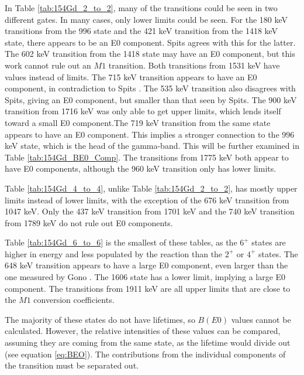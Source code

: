 \afterpage{\clearpage}

In Table \ref{tab:154Gd_2_to_2}, many of the transitions could be seen in two different gates. In many cases, only lower limits could be seen. For the 180 keV transitions from the 996 state and the 421 keV transition from the 1418 keV state, there appears to be an E0 component. Spits \cite{spits96:_154gd} agrees with this for the latter. The 602 keV transition from the 1418 state may have an E0 component, but this work cannot rule out an $M1$ transition. Both transitions from 1531 keV have values instead of limits. The 715 keV transition appears to have an E0 component, in contradiction to Spits \cite{spits96:_154gd}. The 535 keV transition also disagrees with Spits, giving an E0 component, but smaller than that seen by Spits. The 900 keV transition from 1716 keV was only able to get upper limits, which lends itself toward a small E0 component.The 719 keV transition from the same state appears to have an E0 component. This implies a stronger connection to the 996 keV state, which is the head of the gamma-band. This will be further examined in Table \ref{tab:154Gd_BE0_Comp}. The transitions from 1775 keV both appear to have E0 components, although the 960 keV transition only has lower limits.

\afterpage{\clearpage}

Table \ref{tab:154Gd_4_to_4}, unlike Table \ref{tab:154Gd_2_to_2}, has mostly upper limits instead of lower limits, with the exception of the 676 keV transition from 1047 keV. Only the 437 keV transition from 1701 keV and the 740 keV transition from 1789 keV do not rule out E0 components.

\afterpage{\clearpage}

Table \ref{tab:154Gd_6_to_6} is the smallest of these tables, as the $6^+$ states are higher in energy and less populated by the reaction than the $2^+$ or $4^+$ states. The 648 keV transition appears to have a large E0 component, even larger than the one measured by Gono \cite{gono74:_154gd_e0}. The 1606 state has a lower limit, implying a large E0 component. The transitions from 1911 keV are all upper limits that are close to the $M1$ conversion coefficients.   

The majority of these states do not have lifetimes, so $B(E0)$ values cannot be calculated. However, the relative intensities of these values can be compared, assuming they are coming from the same state, as the lifetime would divide out (see equation \ref{eq:BEO}). The contributions from the individual components of the transition must be separated out.

